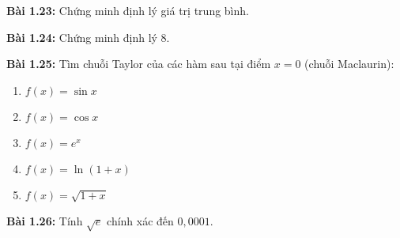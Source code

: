 \textbf{Bài 1.23:} Chứng minh định lý giá trị trung bình.
\vspace{5pt}

\textbf{Bài 1.24:} Chứng minh định lý 8.

\textbf{Bài 1.25:} Tìm chuỗi Taylor của các hàm sau tại điểm \(x=0\) (chuỗi Maclaurin):
\begin{enumerate}[label=(\alph*)]
    \item \(f(x)=\sin x\)
    \item \(f(x)=\cos x\)
    \item \(f(x)=e^x\)
    \item \(f(x)=\ln(1+x)\)
    \item \(f(x)=\sqrt{1+x}\)
\end{enumerate}
\vspace{5pt}

\textbf{Bài 1.26:} Tính \(\sqrt{e}\) chính xác đến \(0,0001\). 